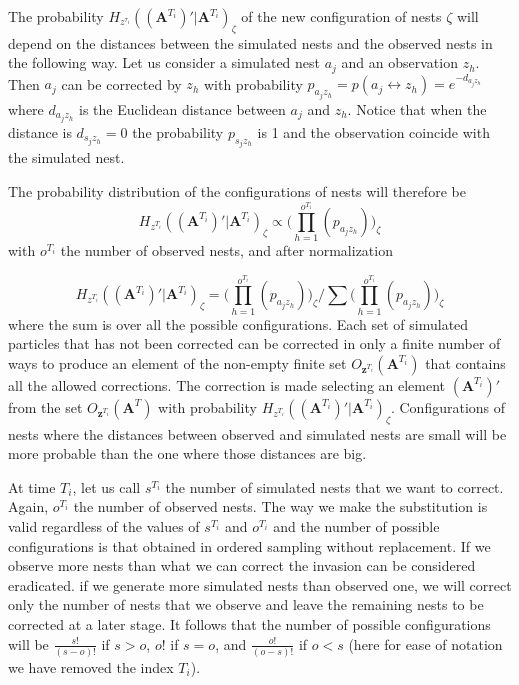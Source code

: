 \documentclass{article}
\renewcommand{\vec}[1]{\mathbf{#1}}
\begin{document}
The probability $H_{z^{\tau_i}}((\vec{A}^{T_i})' | \vec{A}^{T_i})_{\zeta}$ of the new configuration of nests $\zeta$ will depend on the distances between the simulated nests and the observed nests in the following way. Let us consider a simulated nest $a_j$ and an observation $z_h$. Then $a_j$ can be corrected by $z_h$ with probability $p_{a_j z_h} = p(a_j \leftrightarrow z_h) = e^{-d_{a_j z_h}}$ where $d_{a_j z_h}$ is the Euclidean distance between $a_j$ and $z_h$. Notice that when the distance is $d_{s_j z_h} = 0$ the probability $p_{s_j z_h}$ is 1 and the observation coincide with the simulated nest. 

The probability distribution of the configurations of nests will therefore be
\begin{equation*}
    H_{z^{T_i}}((\vec{A}^{T_i})' | \vec{A}^{T_i})_{\zeta} \propto \Bigg( \prod_{h = 1}^{o^{T_i}} (p_{a_j z_h}) \Bigg)_{\zeta}
\end{equation*}
with $o^{T_i}$ the number of observed nests, and after normalization 

\begin{equation*}
    H_{z^{T_i}}((\vec{A}^{T_i})' | \vec{A}^{T_i})_{\zeta} = \Bigg(\prod_{h = 1}^{o^{T_i}} (p_{a_j z_h}) \Bigg)_{\zeta} / \sum \Bigg(\prod_{h = 1}^{o^{T_i}} (p_{a_j z_h}) \Bigg)_{\zeta}
\end{equation*} 
where the sum is over all the possible configurations. Each set of simulated particles that has not been corrected can be corrected in only a finite number of ways to produce an element of the non-empty finite set $O_{\vec{z}^{T_i}} (\vec{A}^{T_i})$ that contains all the allowed corrections. The correction is made selecting an element $(\vec{A}^{T_i})'$ from the set $O_{\vec{z}^{T_i}} (\vec{A}^T)$ with probability $H_{z^{T_i}}((\vec{A}^{T_i})' | \vec{A}^{T_i})_{\zeta}$. Configurations of nests where the distances between observed and simulated nests are small will be more probable than the one where those distances are big.

At time $T_i$, let us call $s^{T_i}$ the number of simulated nests that we want to correct. Again, $o^{T_i}$ the number of observed nests. The way we make the substitution is valid regardless of the values of $s^{T_i}$ and $o^{T_i}$ and the number of possible configurations is that obtained in ordered sampling without replacement. If we observe more nests than what we can correct the invasion can be considered eradicated. if we generate more simulated nests than observed one, we will correct only the number of nests that we observe and leave the remaining nests to be corrected at a later stage.
It follows that the number of possible configurations will be $\frac{s!}{(s-o)!}$ if $s > o$, $o!$ if $s = o$, and $\frac{o!}{(o-s)!}$ if $o < s$ (here for ease of notation we have removed the index ${T_i}$).
\end{document}
